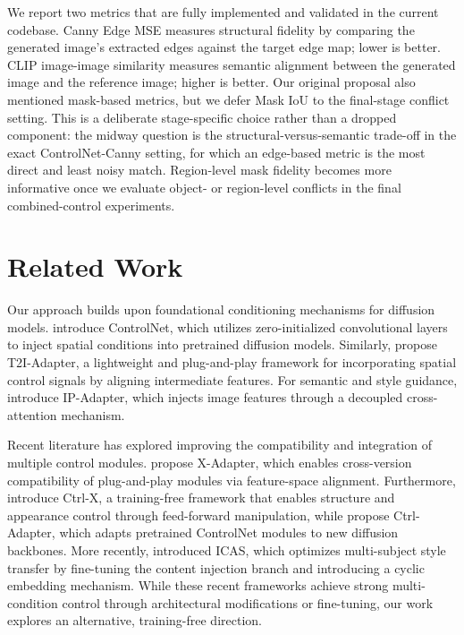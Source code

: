 \documentclass[twocolumn,11pt]{article}
\begin{document}
We report two metrics that are fully implemented and validated in the current codebase. Canny Edge MSE measures structural fidelity by comparing the generated image's extracted edges against the target edge map; lower is better. CLIP image-image similarity measures semantic alignment between the generated image and the reference image; higher is better. Our original proposal also mentioned mask-based metrics, but we defer Mask IoU to the final-stage conflict setting. This is a deliberate stage-specific choice rather than a dropped component: the midway question is the structural-versus-semantic trade-off in the exact ControlNet-Canny setting, for which an edge-based metric is the most direct and least noisy match. Region-level mask fidelity becomes more informative once we evaluate object- or region-level conflicts in the final combined-control experiments.

\section{Related Work}

Our approach builds upon foundational conditioning mechanisms for diffusion models. \citet{zhang2023controlnet} introduce ControlNet, which utilizes zero-initialized convolutional layers to inject spatial conditions into pretrained diffusion models. Similarly, \citet{mou2023t2iadapter} propose T2I-Adapter, a lightweight and plug-and-play framework for incorporating spatial control signals by aligning intermediate features. For semantic and style guidance, \citet{ye2023ipadapter} introduce IP-Adapter, which injects image features through a decoupled cross-attention mechanism.

Recent literature has explored improving the compatibility and integration of multiple control modules. \citet{ran2023xadapter} propose X-Adapter, which enables cross-version compatibility of plug-and-play modules via feature-space alignment. Furthermore, \citet{lin2024ctrlx} introduce Ctrl-X, a training-free framework that enables structure and appearance control through feed-forward manipulation, while \citet{lin2024ctrladapter} propose Ctrl-Adapter, which adapts pretrained ControlNet modules to new diffusion backbones. More recently, \citet{liu2025icas} introduced ICAS, which optimizes multi-subject style transfer by fine-tuning the content injection branch and introducing a cyclic embedding mechanism. While these recent frameworks achieve strong multi-condition control through architectural modifications or fine-tuning, our work explores an alternative, training-free direction.
\end{document}

